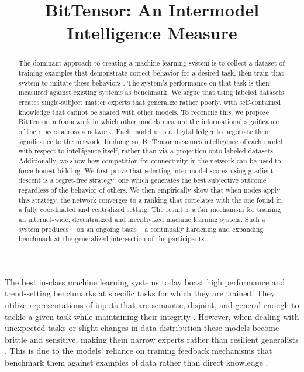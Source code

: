 \documentclass{article}
\title{BitTensor: An Intermodel Intelligence Measure}
\begin{document}
\maketitle

\begin{abstract}

The dominant approach to creating a machine learning system is to collect a dataset of training examples that demonstrate correct behavior for a desired task, then train that system to imitate these behaviors \cite{radford2019language}. The system's performance on that task is then measured against existing systems as benchmark. We argue that using labeled datasets creates single-subject matter experts that generalize rather poorly, with self-contained knowledge that cannot be shared with other models. To reconcile this, we propose BitTensor: a framework in which other models measure the informational significance of their peers across a network. Each model uses a digital ledger to negotiate their significance to the network. In doing so, BitTensor measures intelligence of each model with respect to intelligence itself, rather than via a projection onto labeled datasets. Additionally, we show how competition for connectivity in the network can be used to force honest bidding. We first prove that selecting inter-model scores using gradient descent is a regret-free strategy: one which generates the best subjective outcome regardless of the behavior of others. We then empirically show that when nodes apply this strategy, the network converges to a ranking that correlates with the one found in a fully coordinated and centralized setting. The result is a fair mechanism for training an internet-wide, decentralized and incentivized machine learning system. Such a system produces – on an ongoing basis – a continually hardening and expanding benchmark at the generalized intersection of the participants. 
\end{abstract}

The best in-class machine learning systems today boast high performance and trend-setting benchmarks at specific tasks for which they are trained. They utilize representations of inputs that are semantic, disjoint, and general enough to tackle a given task while maintaining their integrity \cite{radford2019language,devlin2018bert}. However, when dealing with unexpected tasks or slight changes in data distribution these models become brittle and sensitive, making them narrow experts rather than resilient generalists \cite{radford2019language}. This is due to the models' reliance on training feedback mechanisms that benchmark them against examples of data rather than direct knowledge \cite{wang2018glue}. 
\end{document}
